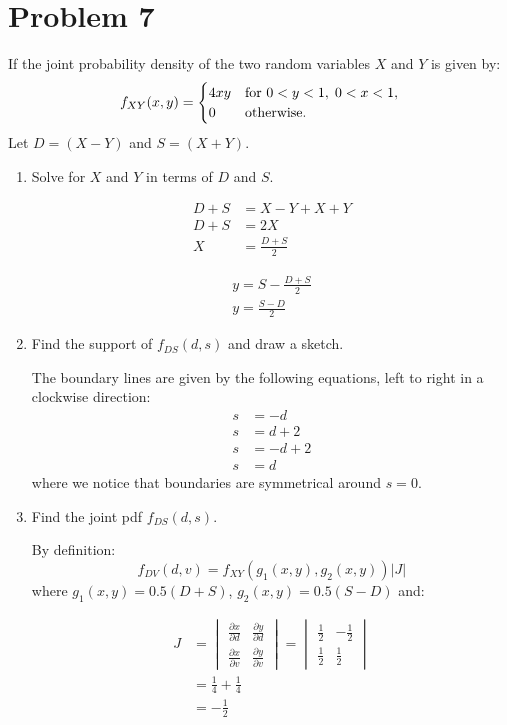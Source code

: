 \documentclass{article}
\newcommand{\1}{\mathbf{1}}
\begin{document}
\newpage
\section*{Problem 7} 
If the joint probability density of the two random variables $X$ and $Y$ is given by:
$$ f_{XY}(x,y) = \begin{cases}
    4xy & \hbox{for } 0 < y<1,\; 0<x <1,\\
    0 & \hbox{otherwise.}
    \end{cases}$$
Let $D=(X-Y)$ and $S=(X+Y)$.  

\begin{enumerate}
    \item Solve for $X$  and $Y$ in terms of $D$ and $S$.

    \begin{align*}
        D + S &= X - Y + X + Y \\
        D + S &= 2X \\
        X &= \frac{D + S}{2}
    \end{align*}

    \begin{align*} 
        y = S - \frac{D + S}{2} \\
        y = \frac{S - D}{2}
    \end{align*}

    \item Find the support of $f_{DS}(d,s)$ and draw a sketch.
    
    The boundary lines are given by the following equations, left to right in a clockwise direction:
    \begin{align*}
        s &= -d \\
        s &= d+2 \\
        s &= -d+2 \\
        s &= d
    \end{align*}
    where we notice that boundaries are symmetrical around $s=0$. 

    \item Find the joint pdf $f_{DS}(d,s)$.
    
    By definition:
    $$f_{DV}(d,v) = f_{XY}(g_1(x,y), g_2(x,y)) |J|$$
    where $g_1(x,y)=0.5(D+S)$, $g_2(x,y)=0.5(S-D)$ and:
    
    \begin{align*}
    J &= \begin{vmatrix}
        \frac{\partial x}{\partial d} & \frac{\partial y}{\partial d} \\ 
        \frac{\partial x}{\partial v} & \frac{\partial y}{\partial v}
        \end{vmatrix} 
     = \begin{vmatrix}
        \frac{1}{2} & -\frac{1}{2} \\ 
        \frac{1}{2} & \frac{1}{2}
        \end{vmatrix} \\
    &= \frac{1}{4} + \frac{1}{4} \\
    &= - \frac{1}{2}
    \end{align*}
    

\end{enumerate}
\end{document}
